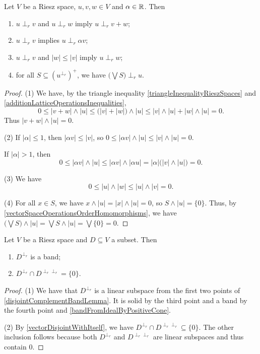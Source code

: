 \begin{lemma} \label{disjointComplementBandLemma}
Let $V$ be a Riesz space, $u,v,w\in V$ and $\alpha \in \mathbb{R}$. Then
\begin{enumerate}
\item $u\perp_r v$ and $u\perp_r w$ imply $u\perp_r v+w$;
\item $u\perp_r v$ implies $u\perp_r \alpha v$;
\item $u\perp_r v$ and $|w|\leq |v|$ imply $u\perp_r w$;
\item for all $S\subseteq (u^{\perp_r})^+$, we have $\big(\bigvee S\big) \perp_r u$.
\end{enumerate}
\end{lemma}
\begin{proof}
(1) We have, by the triangle inequality \ref{triangleInequalityRieszSpaces} and \ref{additionLatticeOperationsInequalities},
\[ 0\leq |v+w|\wedge |u| \leq \big(|v| + |w|\big)\wedge |u| \leq |v|\wedge |u| + |w|\wedge |u| = 0.  \]
Thus $|v+w|\wedge |u| = 0$.

(2) If $|\alpha|\leq 1$, then $|\alpha v|\leq |v|$, so $0\leq |\alpha v|\wedge |u| \leq |v|\wedge |u| = 0$.

If $|\alpha| > 1$, then
\[ 0\leq |\alpha v|\wedge |u| \leq |\alpha v|\wedge |\alpha u| = |\alpha|\big(|v|\wedge |u|\big) = 0. \]

(3) We have
\[ 0\leq |u|\wedge |w| \leq |u|\wedge |v| = 0. \]

(4) For all $x\in S$, we have $x\wedge |u| = |x|\wedge |u| = 0$, so $S\wedge |u| = \{0\}$. Thus, by \ref{vectorSpaceOperationsOrderHomomorphisms}, we have $\big(\bigvee S\big) \wedge |u| = \bigvee S\wedge |u| = \bigvee\{0\} = 0$. 
\end{proof}

\begin{proposition} \label{disjointPolarBand}
Let $V$ be a Riesz space and $D\subseteq V$ a subset. Then
\begin{enumerate}
\item $D^{\perp_r}$ is a band;
\item $D^{\perp_r} \cap D^{\perp_r\perp_r} = \{0\}$.
\end{enumerate}
\end{proposition}
\begin{proof}
(1) We have that $D^{\perp_r}$ is a linear subspace from the first two points of \ref{disjointComplementBandLemma}. It is solid by the third point and a band by the fourth point and \ref{bandFromIdealByPositiveCone}.

(2) By \ref{vectorDisjointWithItself}, we have $D^{\perp_r} \cap D^{\perp_r\perp_r} \subseteq \{0\}$. The other inclusion follows because both $D^{\perp_r}$ and $D^{\perp_r\perp_r}$ are linear subspaces and thus contain $0$.
\end{proof}

